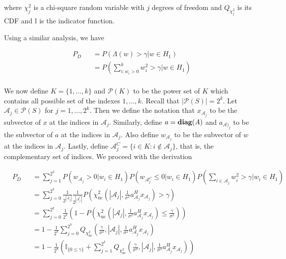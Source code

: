 \documentclass[english]{article}
\begin{document}
where $\chi^2_{j}$ is a chi-square random variable with $j$ degrees of freedom and $Q_{\chi^2_{j}}$ is its CDF and $\mathbb{I}$ is the indicator function.

Using a similar analysis, we have

\begin{equation}
\begin{aligned}
&P_D
&&=P\left(\Lambda(w)>\gamma|w\in H_1\right)\\
&&&=P\left(\sum_{i:w_i>0}^kw_i^2>\gamma|w\in H_1\right)\\
\end{aligned}
\end{equation}

We now define $K = \{1,\dots,k\}$ and $\mathcal{P}(K)$ to be the power set of $K$ which contains all possible set of the indexes $1,\dots,k$. Recall that $|\mathcal{P}(S)|=2^k$. Let $\mathcal{A}_j\in\mathcal{P}(S)$ for $j=1,\dots,2^k$. Then we define the notation that $x_{\mathcal{A}_j}$ to be the subvector of $x$ at the indices in $\mathcal{A}_j$. Similarly, define $a = \mathop{\bf diag}(A)$ and $a_{\mathcal{A})_j}$ to be the subvector of $a$ at the indices in $\mathcal{A}_j$. Also define $w_{\mathcal{A}_j}$ to be the subvector of $w$ at the indices in $\mathcal{A}_j$. Lastly, define $\mathcal{A}_j^C =\{i\in K: i\not\in \mathcal{A}_j\}$, that is, the complementary set of indices. We proceed with the derivation

\begin{equation}\label{eq:basic PD}
\begin{aligned}
&P_D
&&=\sum_{j=1}^{2^k}P\left(w_{\mathcal{A}_j}>0|w_i\in H_1\right)P\left(w_{\mathcal{A}_j^C}\leq0|w_i\in H_1\right)P\left(\sum_{i\in\mathcal{A}_j}w_i^2>\gamma|w_i\in H_1\right)\\
&&&=\sum_{j=0}^{2^k}\frac{1}{2^{|\mathcal{A}_j|}}\frac{1}{2^{|\mathcal{A}_j^C|}}P\left(\chi^2_{\text{nc}}\left(|\mathcal{A}_j|,\frac{1}{\sigma^2}a_{\mathcal{A}_j}^Hx_{\mathcal{A}_j}\right)>\gamma\right)\\
&&&=\sum_{j=0}^{2^k}\frac{1}{2^k}\left(1-P\left(\chi^2_{\text{nc}}\left(|\mathcal{A}_j|,\frac{1}{\sigma^2}a_{\mathcal{A}_j}^Hx_{\mathcal{A}_j}\right)\leq\frac{\gamma}{\sigma^2}\right)\right)\\
&&&=1-\frac{1}{2^k}\sum_{j=0}^{2^k}Q_{\chi^2_{\text{nc}}}\left(\frac{\gamma}{\sigma^2},|\mathcal{A}_j|,\frac{1}{\sigma^2}a_{\mathcal{A}_j}^Hx_{\mathcal{A}_j}\right)\\
&&&=1-\frac{1}{2^k}\left(\mathbb{I}_{\{0\leq\gamma\}}+\sum_{j=1}^{2^k}Q_{\chi^2_{\text{nc}}}\left(\frac{\gamma}{\sigma^2},|\mathcal{A}_j|,\frac{1}{\sigma^2}a_{\mathcal{A}_j}^Hx_{\mathcal{A}_j}\right)\right)\\
\end{aligned}
\end{equation}
\end{document}
